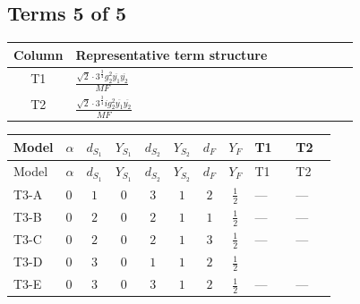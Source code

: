 \documentclass[8pt]{article}
\begin{document}
\begin{landscape}
\subsection*{Terms 5 of 5}
\begin{center}
\begin{tabular}{@{}c >{\raggedright\arraybackslash}p{0.82\linewidth}@{}}
\toprule
Column & Representative term structure \\
\midrule
T1 & \(\displaystyle \frac{\sqrt{2} \cdot 3^{\frac{3}{4}} g_{2}^{2} \overline{y_{1}} \overline{y_{2}}}{MF}\) \\
\midrule
T2 & \(\displaystyle \frac{\sqrt{2} \cdot 3^{\frac{3}{4}} i g_{2}^{2} \overline{y_{1}} \overline{y_{2}}}{MF}\) \\
\midrule
\bottomrule
\end{tabular}
\end{center}
\smallskip
\tiny
\begin{longtable}{@{}llcccccc >{\raggedright\arraybackslash}p{0.21\linewidth} >{\raggedright\arraybackslash}p{0.21\linewidth}@{}}
\toprule
Model & $\alpha$ & $d_{S_1}$ & $Y_{S_1}$ & $d_{S_2}$ & $Y_{S_2}$ & $d_F$ & $Y_F$ & T1 & T2 \\
\midrule
\endfirsthead
\toprule
Model & $\alpha$ & $d_{S_1}$ & $Y_{S_1}$ & $d_{S_2}$ & $Y_{S_2}$ & $d_F$ & $Y_F$ & T1 & T2 \\
\midrule
\endhead
T3-A & $0$ & $1$ & $0$ & $3$ & $1$ & $2$ & $\frac{1}{2}$ & --- & --- \\
\midrule
T3-B & $0$ & $2$ & $0$ & $2$ & $1$ & $1$ & $\frac{1}{2}$ & --- & --- \\
\midrule
T3-C & $0$ & $2$ & $0$ & $2$ & $1$ & $3$ & $\frac{1}{2}$ & --- & --- \\
\midrule
T3-D & $0$ & $3$ & $0$ & $1$ & $1$ & $2$ & $\frac{1}{2}$ & \scriptsize\adjustbox{max width=\linewidth}{$\begin{gathered} \frac{\sqrt{2} \cdot 3^{\frac{3}{4}} g_{2}^{2} \overline{y_{1}} \overline{y_{2}}}{6 MF}\end{gathered}$} & \scriptsize\adjustbox{max width=\linewidth}{$\begin{gathered} \frac{\sqrt{2} \cdot 3^{\frac{3}{4}} i g_{2}^{2} \overline{y_{1}} \overline{y_{2}}}{6 MF}\end{gathered}$} \\
\midrule
T3-E & $0$ & $3$ & $0$ & $3$ & $1$ & $2$ & $\frac{1}{2}$ & --- & --- \\
\midrule
\bottomrule
\end{longtable}
\clearpage

\end{landscape}
\end{document}
